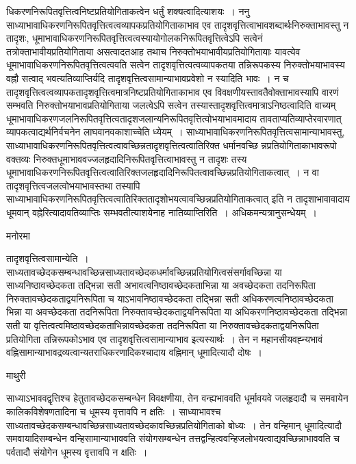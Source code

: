 \documentclass[10pt, openany]{book}
\begin{document}
{धिकरणनिरूपितवृत्तित्वनिष्टप्रतियोगिताकत्वेन धर्तुं शक्यत्वादित्याशयः~। ननु साध्याभावाधिकरणनिरूपितवृत्तित्वत्वव्यापकप्रतियोगिताकाभाव एव तादृशवृत्तित्वाभावशब्दार्थःनिरुक्ताभावस्तु न तादृशः, धूमाभावाधिकरणनिरूपितवृत्तित्वत्वस्यायोगोलकनिरूपितवृत्तित्वेऽपि सत्वेनं तत्रोक्ताभावीयप्रतियोगिताया असत्वादतआह तथाच निरुक्तोभयाभावीयप्रतियोगितायाः यावत्येव धूमाभावाधिकरणनिरूपितवृत्तित्वत्ववति सत्वेन तादृशवृत्तित्वत्वव्यापकतया तन्निरूपकस्य निरुक्तोभयाभावस्य वह्नौ सत्वाद् भवत्यतिव्याप्तिर्यदि तादृशवृत्तित्वसामान्याभावप्रवेशो न स्यादिति भावः~। न च तादृशवृत्तित्वत्वव्यापकतादृशवृत्तित्वमात्रनिष्टप्रतियोगिताकाभाव एव विवक्षणीयस्तावतैवोक्ताभावस्यापि वारणं सम्भवति निरुक्तोभयाभावप्रतियोगिताया जलत्वेऽपि सत्वेन तस्यास्तादृशवृत्तित्वमात्राऽनिष्ठत्वादिति वाच्यम् धूमाभावाधिकरणजलनिरूपितवृत्तित्वतादृशजलान्यनिरूपितवृत्तित्वोभयाभावमादाय तावताप्यतिव्याप्तेरवारणात् व्यापकत्वाद्यर्थनिर्वचनेन लाघवानवकाशाच्चेति ध्येयम्~। साध्याभावाधिकरणनिरूपितवृत्तित्वसामान्याभावस्तु,  साध्याभावाधिकरणनिरूपितवृत्तित्वत्वावच्छिन्नतादृशवृत्तित्वत्वातिरिक्त धर्मानवच्छि न्नप्रतियोगिताकाभावरूपो वक्तव्यः निरुक्तधूमाभाववज्जलहृदादिनिरूपितवृत्तित्वाभावस्तु न तादृशः तस्य धूमाभावाधिकरणनिरूपितवृत्तित्वत्वातिरिक्तजलहृदादिनिरूपितत्वावच्छिन्नप्रतियोगिताकत्वात्~। न वा तादृशवृत्तित्वजलत्वोभयाभावस्तथा तस्यापि
साध्याभावाधिकरणनिरूपितवृत्तित्वत्वातिरिक्ततादृशोभयत्वावच्छिन्नप्रतियोगिताकत्वात् इति न तादृशाभावावादाय धूमवान् वह्नेरित्यादावतिव्याप्तिः सम्भवतीत्याशयेनाह {\la नातिव्याप्तिरिति~।} अधिकमन्यत्रानुसन्धेयम्~।

\begin{center}   मनोरमा  \end{center}

{\la तादृशवृत्तित्वसामान्येति~।}
साध्यतावच्छेदकसम्बन्धावच्छिन्नसाध्यतावच्छेदकधर्मावच्छिन्नप्रतियोगित्वसंसर्गावच्छिन्ना या साध्यनिष्ठावच्छेदकता तद्भिन्ना सती अभावत्वनिष्ठावच्छेदकताभिन्ना या अवच्छेदकता तदनिरूपिता निरुक्तावच्छेदकताद्वयनिरूपिता च याऽभावनिष्ठावच्छेदकता तद्भिन्ना सती अधिकरणत्वनिष्ठावच्छेदकता भिन्ना या अवच्छेदकता तदनिरूपिता निरुक्तावच्छेदकताद्वयनिरूपिता या अधिकरणनिष्ठावच्छेदकता तद्भिन्ना सती या वृत्तित्वत्वमिष्ठावच्छेदकताभिन्नावच्छेदकता तदनिरूपिता या निरुक्तावच्छेदकताद्वयनिरूपिता प्रतियोगिता तन्निरूपकोऽभाव एव तादृशवृत्तित्वसामान्याभाव इत्यस्यार्थः~। तेन न महानसीयवह्न्यभावं वह्निसामान्याभावद्रव्यत्वान्यतराधिकरणादिकश्चादाय वह्निमान् धूमादित्यादौ दोषः~।

\newpage
\begin{center}  माथुरी  \end{center}
 साध्याऽभाववद्वृत्तिश्च हेतुतावच्छेदकसम्बन्धेन विवक्षणीया, तेन वन्ह्यभाववति धूर्मावयवे जलहृदादौ च समवायेन कालिकविशेषणतादिना च धूमस्य वृत्तावपि न क्षतिः~। साध्याभावश्च साध्यतावच्छेदकसम्बन्धावच्छिन्नसाध्यतावच्छेदकावच्छिन्नप्रतियोगिताको बोध्यः~। तेन वन्हिमान् धूमादित्यादौ समवायादिसम्बन्धेन वन्हिसामान्याभाववति संयोगसम्बन्धेन तत्तद्वन्हित्ववन्हिजलोभयत्वाद्यवच्छिन्नाभाववति च पर्वतादौ संयोगेन धूमस्य वृत्तावपि न क्षतिः~।
 
}
\end{document}
